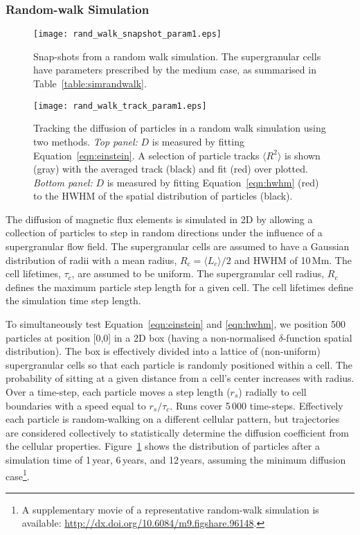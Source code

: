\subsubsection{Random-walk Simulation}\label{sect:simrandwalk}

 \begin{figure}[!t]
   \centerline{\texttt{[image: rand\_walk\_snapshot\_param1.eps]}}
              \caption[A random walk simulation.]{Snap-shots from a random walk simulation. The supergranular cells have parameters prescribed by the medium case, as summarised in Table~\ref{table:simrandwalk}.}
   \label{fig:randomwalk}
   \end{figure}

 \begin{figure}[!t]
   \centerline{\texttt{[image: rand\_walk\_track\_param1.eps]}}
              \caption[The results of a random walk simulation.]{Tracking the diffusion of particles in a random walk simulation using two methods. \emph{Top panel:} $D$ is measured by fitting Equation~\ref{eqn:einstein}. A selection of particle tracks $\langle R^2 \rangle$ is shown (gray) with the averaged track (black) and fit (red) over plotted. \emph{Bottom panel:} $D$ is measured by fitting Equation~\ref{eqn:hwhm} (red) to the HWHM of the spatial distribution of particles (black).}
   \label{fig:fitrandomwalk}
   \end{figure}

The diffusion of magnetic flux elements is simulated in 2D by allowing a collection of particles to step in random directions under the influence of a supergranular flow field. The supergranular cells are assumed to have a Gaussian distribution of radii with a mean radius, $R_c = \langle L_c \rangle/2$ and HWHM of 10\,Mm. The cell lifetimes, $\tau_c$, are assumed to be uniform. The supergranular cell radius, $R_c$ defines the maximum particle step length for a given cell. The cell lifetimes define the simulation time step length. 

 To simultaneously test Equation~\ref{eqn:einstein} and \ref{eqn:hwhm}, we position 500 particles at position [0,0] in a 2D box (having a non-normalised $\delta$-function spatial distribution). The box is effectively divided into a lattice of (non-uniform) supergranular cells so that each particle is randomly positioned within a cell. The probability of sitting at a given distance from a cell's center increases with radius. %
 Over a time-step, each particle moves a step length ($r_s$) radially to cell boundaries with a speed equal to $r_s / \tau_c$.  Runs cover 5\,000 time-steps. 
Effectively each particle is random-walking on a different cellular pattern, but trajectories are considered collectively to statistically determine the diffusion coefficient from the cellular properties. 
Figure~\ref{fig:randomwalk} shows the distribution of particles after a simulation time of 1\,year, 6\,years, and 12\,years, assuming the minimum diffusion case\footnote{A supplementary movie of a representative random-walk simulation is available: \url{http://dx.doi.org/10.6084/m9.figshare.96148}.}. 

